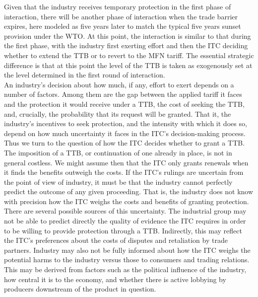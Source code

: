 \documentclass[12pt]{article}
\begin{document}
Given that the industry receives temporary protection in the first phase of interaction, there will be another phase of interaction when the trade barrier expires, here modeled as five years later to match the typical five years sunset provision under the WTO. At this point, the interaction is similar to that during the first phase, with the industry first exerting effort and then the ITC deciding whether to extend the TTB or to revert to the MFN tariff. The essential strategic difference is that at this point the level of the TTB is taken as exogenously set at the level determined in the first round of interaction. \\

An industry's decision about how much, if any, effort to exert depends on a number of factors. Among them are the gap between the applied tariff it faces and the protection it would receive under a TTB, the cost of seeking the TTB, and, crucially, the probability that its request will be granted. That it, the industry's incentives to seek protection, and the intensity with which it does so, depend on how much uncertainty it faces in the ITC's decision-making process. \\
 
Thus we turn to the question of how the ITC decides whether to grant a TTB. The imposition of a TTB, or continuation of one already in place, is not in general costless. We might assume then that the ITC only grants renewals when it finds the benefits outweigh the costs. If the ITC's rulings are uncertain from the point of view of industry, it must be that the industry cannot perfectly predict the outcome of any given proceeding. That is, the industry does not know with precision how the ITC weighs the costs and benefits of granting protection.\\

There are several possible sources of this uncertainty. The industrial group may not be able to predict directly the quality of evidence the ITC requires in order to be willing to provide protection through a TTB. Indirectly, this may reflect the ITC's preferences about the costs of disputes and retaliation by trade partners. Industry may also not be fully informed about how the ITC weighs the potential harms to the industry versus those to consumers and trading relations. This may be derived from factors such as the political influence of the industry, how central it is to the economy, and whether there is active lobbying by producers downstream of the product in question. \\
\end{document}
